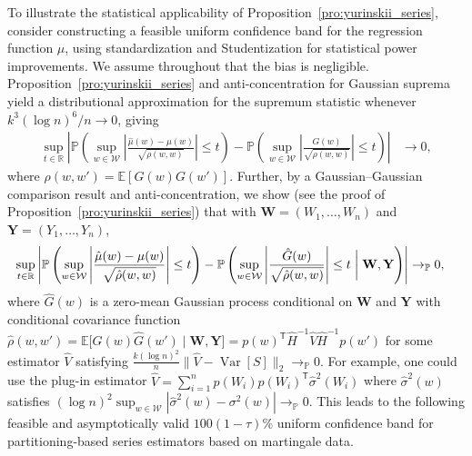 \documentclass[11pt,lof]{puthesis}
\renewcommand{\P}{\ensuremath{\mathbb{P}}}
\newcommand{\R}{\ensuremath{\mathbb{R}}}
\newcommand{\E}{\ensuremath{\mathbb{E}}}
\newcommand{\bW}{\ensuremath{\mathbf{W}}}
\newcommand{\bY}{\ensuremath{\mathbf{Y}}}
\newcommand{\cW}{\ensuremath{\mathcal{W}}}
\newcommand{\T}{\ensuremath{\mathsf{T}}}
\DeclareMathOperator{\Var}{Var}
\theoremstyle{break}
\theoremstyle{proof}
\begin{document}
To illustrate the statistical applicability of
Proposition~\ref{pro:yurinskii_series}, consider constructing a feasible uniform
confidence band for the regression function $\mu$, using standardization and
Studentization for statistical power improvements. We assume throughout that
the bias is negligible. Proposition~\ref{pro:yurinskii_series} and
anti-concentration for
Gaussian suprema \citep[Corollary~2.1]{chernozhukov2014anti} yield
a distributional approximation for the supremum statistic whenever
$k^3(\log n)^6 / n \to 0$, giving
%
\begin{align*}
  \sup_{t \in \R}
  \left|
  \P\left(
    \sup_{w \in \cW}
    \left|
    \frac{\hat\mu(w)-\mu(w)}{\sqrt{\rho(w,w)}}
    \right| \leq t
  \right)
  -
  \P\left(
    \sup_{w \in \cW}
    \left|
    \frac{G(w)}{\sqrt{\rho(w,w)}}
    \right| \leq t
  \right)
  \right|
  &\to 0,
\end{align*}
%
where $\rho(w,w') = \E[G(w)G(w')]$. Further, by a Gaussian--Gaussian
comparison result \citep[Lemma~3.1]{chernozhukov2013gaussian} and
anti-concentration, we show (see the proof of
Proposition~\ref{pro:yurinskii_series}) that with $\bW = (W_1, \ldots, W_n)$ and
$\bY = (Y_1, \ldots, Y_n)$,
%
\begin{align*}
  \sup_{t \in \R}
  \left|
  \P\left(
    \sup_{w \in \cW}
    \left|
    \frac{\hat\mu(w)-\mu(w)}{\sqrt{\hat\rho(w,w)}}
    \right| \leq t
  \right)
  - \P\left(
    \sup_{w \in \cW}
    \left|
    \frac{\hat G(w)}{\sqrt{\hat\rho(w,w)}}
    \right| \leq t \biggm| \bW, \bY
  \right)
  \right|
  &\to_\P 0,
\end{align*}
%
where $\hat G(w)$ is a zero-mean Gaussian process
conditional on $\bW$ and $\bY$ with conditional covariance function
$\hat\rho(w,w')
=\E\big[\hat G(w) \hat G(w') \mid \bW, \bY \big]
= p(w)^\T \hat H^{-1} \hat V \hat H^{-1}p(w')$
for some estimator $\hat V$ satisfying
$\frac{k (\log n)^2}{n}
\big\|\hat V-\Var[S]\big\|_2 \to_\P 0$.
For example, one could use the plug-in estimator
$\hat V=\sum_{i=1}^n p(W_i) p(W_i)^\T \hat{\sigma}^2(W_i)$
where $\hat{\sigma}^2(w)$ satisfies
$(\log n)^2 \sup_{w \in \cW}
|\hat{\sigma}^2(w)-\sigma^2(w)| \to_\P 0$.
This leads to the following feasible and asymptotically valid
$100(1-\tau)\%$
uniform confidence band for partitioning-based series estimators
based on martingale data.
\end{document}

